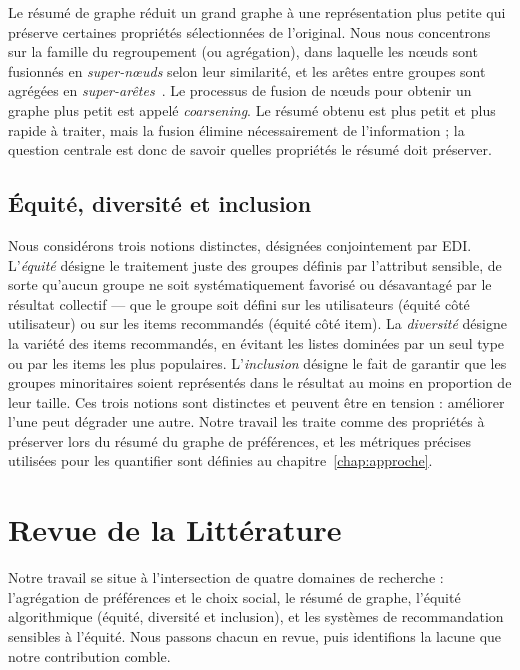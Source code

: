 \documentclass[12pt]{report}
\begin{document}
Le résumé de graphe réduit un grand graphe à une représentation plus
petite qui préserve certaines propriétés sélectionnées de l'original. Nous
nous concentrons sur la famille du regroupement (ou agrégation), dans
laquelle les nœuds sont fusionnés en \emph{super-nœuds} selon leur
similarité, et les arêtes entre groupes sont agrégées en
\emph{super-arêtes}~\cite{liu_graph_2018}. Le processus de fusion de
nœuds pour obtenir un graphe plus petit est appelé \emph{coarsening}. Le
résumé obtenu est plus petit et plus rapide à traiter, mais la fusion
élimine nécessairement de l'information ; la question centrale est donc de
savoir quelles propriétés le résumé doit préserver.

\subsection{Équité, diversité et inclusion}

Nous considérons trois notions distinctes, désignées conjointement par
EDI. L'\emph{équité} désigne le traitement juste des groupes définis par
l'attribut sensible, de sorte qu'aucun groupe ne soit systématiquement
favorisé ou désavantagé par le résultat collectif --- que le groupe soit
défini sur les utilisateurs (équité côté utilisateur) ou sur les items
recommandés (équité côté item). La \emph{diversité} désigne la variété des
items recommandés, en évitant les listes dominées par un seul type ou par
les items les plus populaires. L'\emph{inclusion} désigne le fait de
garantir que les groupes minoritaires soient représentés dans le résultat
au moins en proportion de leur taille. Ces trois notions sont distinctes
et peuvent être en tension : améliorer l'une peut dégrader une autre.
Notre travail les traite comme des propriétés à préserver lors du résumé
du graphe de préférences, et les métriques précises utilisées pour les
quantifier sont définies au chapitre~\ref{chap:approche}.

\section{Revue de la Littérature}
\label{sec:litreview}

Notre travail se situe à l'intersection de quatre domaines de recherche :
l'agrégation de préférences et le choix social, le résumé de graphe,
l'équité algorithmique (équité, diversité et inclusion), et les systèmes
de recommandation sensibles à l'équité. Nous passons chacun en revue,
puis identifions la lacune que notre contribution comble.
\end{document}
